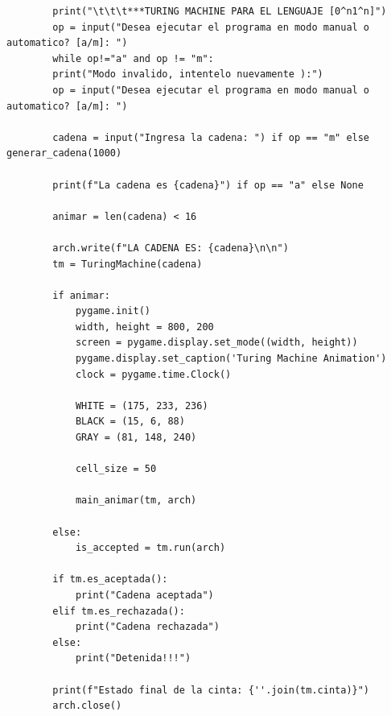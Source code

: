 \documentclass[11pt]{article} %
\begin{document}
\begin{lstlisting}
		print("\t\t\t***TURING MACHINE PARA EL LENGUAJE [0^n1^n]")
		op = input("Desea ejecutar el programa en modo manual o automatico? [a/m]: ")
		while op!="a" and op != "m":
		print("Modo invalido, intentelo nuevamente ):")
		op = input("Desea ejecutar el programa en modo manual o automatico? [a/m]: ")
		
		cadena = input("Ingresa la cadena: ") if op == "m" else generar_cadena(1000)
		
		print(f"La cadena es {cadena}") if op == "a" else None
		
		animar = len(cadena) < 16
		
		arch.write(f"LA CADENA ES: {cadena}\n\n")
		tm = TuringMachine(cadena)
		
		if animar:
			pygame.init()
			width, height = 800, 200
			screen = pygame.display.set_mode((width, height))
			pygame.display.set_caption('Turing Machine Animation')
			clock = pygame.time.Clock()
			
			WHITE = (175, 233, 236)
			BLACK = (15, 6, 88)
			GRAY = (81, 148, 240)
			
			cell_size = 50
			
			main_animar(tm, arch)
		
		else:
			is_accepted = tm.run(arch)
		
		if tm.es_aceptada():
			print("Cadena aceptada")
		elif tm.es_rechazada():
			print("Cadena rechazada")
		else:
			print("Detenida!!!")
		
		print(f"Estado final de la cinta: {''.join(tm.cinta)}")
		arch.close()
		
	
	
	\end{lstlisting}

	
	
\end{document}
